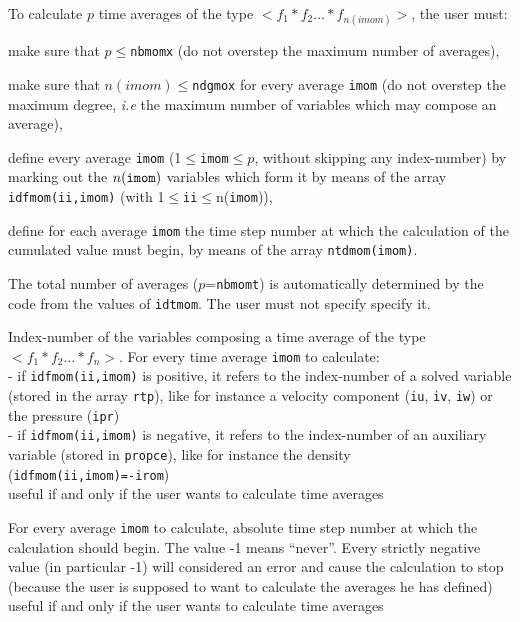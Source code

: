 To calculate $p$ time averages of the type $<f_1*f_2...*f_{n(imom)}>$,
the user must:
\begin{list}{-}{}
\item make sure that $p\leqslant${\tt nbmomx} (do not overstep the maximum
      number of averages),
\item make sure that $n(imom)\leqslant${\tt ndgmox} for every average {\tt imom}
       (do not overstep the maximum degree, {\it i.e} the maximum number
       of variables which may compose an average),
\item define every average {\tt imom} (1$\leqslant${\tt imom}$\leqslant p$,
      without skipping any index-number) by marking out the $n({\tt imom})$
      variables which form it by means of the array {\tt idfmom(ii,imom)} (with
      1$\leqslant${\tt ii}$\leqslant$n({\tt imom})),
\item define for each average {\tt imom} the time step number at which the
      calculation of the cumulated value must begin, by means of the
      array {\tt ntdmom(imom)}.
\end{list}

The total number of averages ($p$={\tt nbmomt}) is automatically determined by
the code from the values of {\tt idtmom}. The user must not specify specify it.

{Index-number of the variables composing a time average of the type
$<f_1*f_2...*f_n>$. For every time average {\tt imom} to calculate:\\
\hspace*{1.3cm} - if {\tt idfmom(ii,imom)} is positive, it refers to the
                  index-number of a solved variable (stored in the array
                  {\tt rtp}), like for instance a velocity component
                  ({\tt iu}, {\tt iv}, {\tt iw})
                  or the pressure ({\tt ipr})\\
\hspace*{1.3cm} - if {\tt idfmom(ii,imom)} is negative, it refers to the
                  index-number of an auxiliary variable (stored in
                  {\tt propce}), like for instance the density\\
                  ({\tt idfmom(ii,imom)=-irom})\\
useful if and only if the user wants to calculate time averages}

{For every average {\tt imom} to calculate, absolute time step number at which
the calculation should begin. The value -1 means ``never''. Every
strictly negative value (in particular -1) will considered an error and
cause the calculation to stop (because the user is supposed to want to
calculate the averages he has defined)\\
useful if and only if the user wants to calculate time averages}

